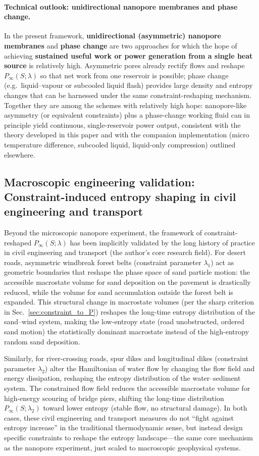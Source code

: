 \documentclass[11pt,a4paper]{article}
\begin{document}
\paragraph{Technical outlook: unidirectional nanopore membranes and phase change.}
In the present framework, \textbf{unidirectional (asymmetric) nanopore membranes} and \textbf{phase change} are two approaches for which the hope of achieving \textbf{sustained useful work or power generation from a single heat source} is relatively high. Asymmetric pores already rectify flows and reshape $P_{\infty}(S;\lambda)$ so that net work from one reservoir is possible; phase change (e.g.\ liquid--vapour or subcooled liquid flash) provides large density and entropy changes that can be harnessed under the same constraint-reshaping mechanism. Together they are among the schemes with relatively high hope: nanopore-like asymmetry (or equivalent constraints) plus a phase-change working fluid can in principle yield continuous, single-reservoir power output, consistent with the theory developed in this paper and with the companion implementation (micro temperature difference, subcooled liquid, liquid-only compression) outlined elsewhere.

\subsection{Macroscopic engineering validation: Constraint-induced entropy shaping in civil engineering and transport}

Beyond the microscopic nanopore experiment, the framework of constraint-reshaped
$P_{\infty}(S;\lambda)$ has been implicitly validated by the long history of
practice in civil engineering and transport (the author's core research field).
For desert roads, asymmetric windbreak forest belts (constraint parameter
$\lambda_1$) act as geometric boundaries that reshape the phase space of sand
particle motion: the accessible macrostate volume for sand deposition on the
pavement is drastically reduced, while the volume for sand accumulation
outside the forest belt is expanded. This structural change in macrostate volumes
(per the sharp criterion in Sec.~\ref{sec:constraint_to_P}) reshapes the
long-time entropy distribution of the sand--wind system, making the low-entropy
state (road unobstructed, ordered sand motion) the statistically dominant
macrostate instead of the high-entropy random sand deposition.

Similarly, for river-crossing roads, spur dikes and longitudinal dikes
(constraint parameter $\lambda_2$) alter the Hamiltonian of water flow by
changing the flow field and energy dissipation, reshaping the entropy
distribution of the water--sediment system. The constrained flow field reduces
the accessible macrostate volume for high-energy scouring of bridge
piers, shifting the long-time distribution $P_{\infty}(S;\lambda_2)$ toward
lower entropy (stable flow, no structural damage). In both cases, these
civil engineering and transport measures do not ``fight against entropy increase'' in the traditional
thermodynamic sense, but instead design specific constraints to reshape the
entropy landscape---the same core mechanism as the nanopore experiment, just
scaled to macroscopic geophysical systems.
\end{document}
